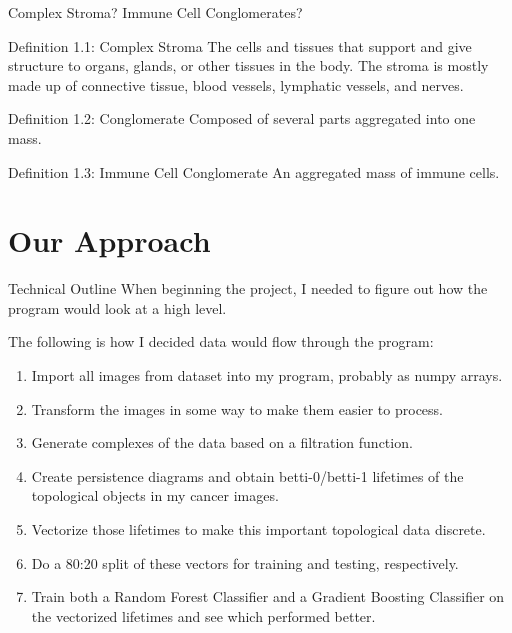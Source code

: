 \documentclass[11pt]{beamer}
\begin{document}
\begin{frame}{Complex Stroma? Immune Cell Conglomerates?}
    \begin{block}{Definition 1.1: Complex Stroma}
    The cells and tissues that support and give structure to organs, glands, or other tissues in the body. The stroma is mostly made up of connective tissue, blood vessels, lymphatic vessels, and nerves.
    \end{block}
    
    \begin{block}{Definition 1.2: Conglomerate}
    Composed of several parts aggregated into one mass.
    \end{block}

    \begin{block}{Definition 1.3: Immune Cell Conglomerate}
    An aggregated mass of immune cells.
    \end{block}

\end{frame}

\section{Our Approach}

\begin{frame}{Technical Outline}
    When beginning the project, I needed to figure out how the program would look at a high level.
    
    \vspace{4mm}
    
    The following is how I decided data would flow through the program:
    \begin{enumerate}
        \item Import all images from dataset into my program, probably as numpy arrays.
        \item Transform the images in some way to make them easier to process.
        \item Generate complexes of the data based on a filtration function.
        \item Create persistence diagrams and obtain betti-0/betti-1 lifetimes of the topological objects in my cancer images.
        \item Vectorize those lifetimes to make this important topological data discrete.
        \item Do a 80:20 split of these vectors for training and testing, respectively.
        \item Train both a Random Forest Classifier and a Gradient Boosting Classifier on the vectorized lifetimes and see which performed better.
    \end{enumerate}
\end{frame}
\end{document}
